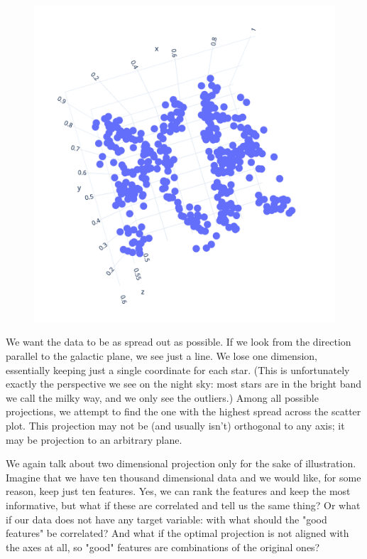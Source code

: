 \begin{figure}
    \includegraphics[scale=0.4]{pca-3d.png}
    \label{fig:pca3d}
\end{figure}

We want the data to be as spread out as possible. If we look from the direction parallel to the galactic plane, we see just a line. We lose one dimension, essentially keeping just a single coordinate for each star. (This is unfortunately exactly the perspective we see on the night sky: most stars are in the bright band we call the milky way, and we only see the outliers.) Among all possible projections, we attempt to find the one with the highest spread across the scatter plot. This projection may not be (and usually isn't) orthogonal to any axis; it may be projection to an arbitrary plane.

We again talk about two dimensional projection only for the sake of illustration. Imagine that we have ten thousand dimensional data and we would like, for some reason, keep just ten features. Yes, we can rank the features and keep the most informative, but what if these are correlated and tell us the same thing? Or what if our data does not have any target variable: with what should the "good features" be correlated? And what if the optimal projection is not aligned with the axes at all, so "good" features are combinations of the original ones?

